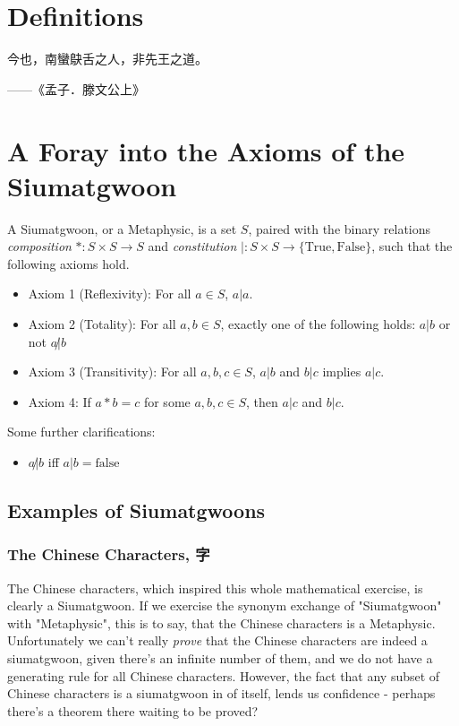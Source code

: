\section{Definitions}

\epigraph{今也，南蠻鴃舌之人，非先王之道。}{——《孟子．滕文公上》}


\section{A Foray into the Axioms of the Siumatgwoon}

A Siumatgwoon, or a Metaphysic, is a set $S$, paired with the binary relations \textit{composition} $* : S \times S \rightarrow S$ and \textit{constitution} $|:S\times S \rightarrow \{\text{True}, \text{False}\}$, such that the following axioms hold. 

\begin{itemize}
\item Axiom 1 (Reflexivity): For all $a \in S$, $a|a$.
\item Axiom 2 (Totality): For all $a,b\in S$, exactly one of the following holds: $a|b$ or not $a\not|b$
\item Axiom 3 (Transitivity): For all $a,b,c\in S$, $a|b$ and $b|c$ implies $a|c$.
\item Axiom 4: If $a*b=c$ for some $a,b,c\in S$, then $a|c$ and $b|c$.
\end{itemize}

Some further clarifications: 

\begin{itemize}
\item $a\not|b$ iff $a|b = \text{false}$
\end{itemize}

\subsection{Examples of Siumatgwoons}

\subsubsection{The Chinese Characters, 字}

The Chinese characters, which inspired this whole mathematical exercise, is clearly a Siumatgwoon. If we exercise the synonym exchange of "Siumatgwoon" with "Metaphysic", this is to say, that the Chinese characters is a Metaphysic. Unfortunately we can't really \textit{prove} that the Chinese characters are indeed a siumatgwoon, given there's an infinite number of them, and we do not have a generating rule for all Chinese characters. However, the fact that any subset of Chinese characters is a siumatgwoon in of itself, lends us confidence - perhaps there's a theorem there waiting to be proved?

